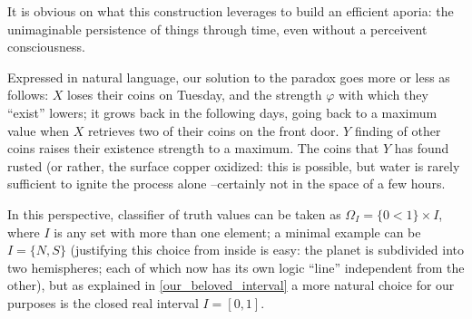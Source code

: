 \begin{example}
  It is obvious on what this construction leverages to build an efficient aporia: the unimaginable persistence of things through time, even without a perceivent consciousness.

  Expressed in natural language, our solution to the paradox goes more or less as follows: $X$ loses their coins on Tuesday, and the strength $\varphi$ with which they ``exist'' lowers; it grows back in the following days, going back to a maximum value when $X$ retrieves two of their coins on the front door. $Y$ finding of other coins raises their existence strength to a maximum. The coins that $Y$ has found rusted (or rather, the surface copper oxidized: this is possible, but water is rarely sufficient to ignite the process alone --certainly not in the space of a few hours.
  \begin{remark}\label{our_beloved_interval}
    In this perspective, \tlon classifier of truth values can be taken as $\Omega_I = \{0<1\}\times I$, where $I$ is any set with more than one element; a minimal example can be $I=\{N,S\}$ (justifying this choice from inside \tlon is easy: the planet is subdivided into two hemispheres; each of which now has its own logic ``line'' independent from the other), but as explained in \autoref{our_beloved_interval} a more natural choice for our purposes is the closed real interval $I=[0,1]$.


\end{remark}
\end{example}
